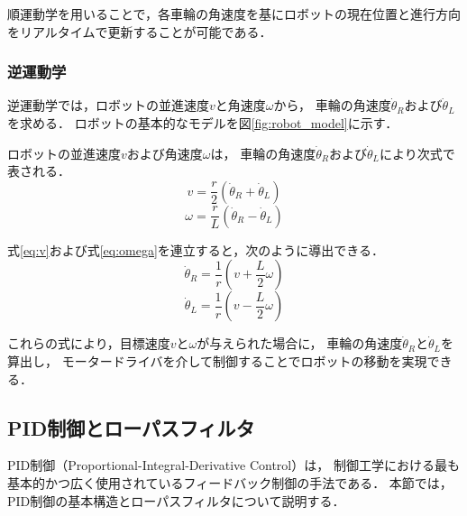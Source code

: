 順運動学を用いることで，各車輪の角速度を基にロボットの現在位置と進行方向をリアルタイムで更新することが可能である．

\subsubsection{逆運動学}
逆運動学では，ロボットの並進速度$v$と角速度$\omega$から，
車輪の角速度$\dot{\theta}_R$および$\dot{\theta}_L$を求める．
ロボットの基本的なモデルを図\ref{fig:robot_model}に示す．

ロボットの並進速度$v$および角速度$\omega$は，
車輪の角速度$\dot{\theta}_R$および$\dot{\theta}_L$により次式で表される．
\begin{equation}
    v = \frac{r}{2} (\dot{\theta}_R + \dot{\theta}_L)
    \label{eq:v}
\end{equation}
\begin{equation}
    \omega = \frac{r}{L} (\dot{\theta}_R - \dot{\theta}_L)
    \label{eq:omega}
\end{equation}

式\eqref{eq:v}および式\eqref{eq:omega}を連立すると，次のように導出できる．
\begin{equation}
    \dot{\theta}_R = \frac{1}{r} (v + \frac{L}{2} \omega)
    \label{eq:theta_R}
\end{equation}
\begin{equation}
    \dot{\theta}_L = \frac{1}{r} (v - \frac{L}{2} \omega)
    \label{eq:theta_L}
\end{equation}

これらの式により，目標速度$v$と$\omega$が与えられた場合に，
車輪の角速度$\dot{\theta}_R$と$\dot{\theta}_L$を算出し，
モータードライバを介して制御することでロボットの移動を実現できる．

\subsection{PID制御とローパスフィルタ}
PID制御（Proportional-Integral-Derivative Control）は，
制御工学における最も基本的かつ広く使用されているフィードバック制御の手法である．
本節では，PID制御の基本構造とローパスフィルタについて説明する．

